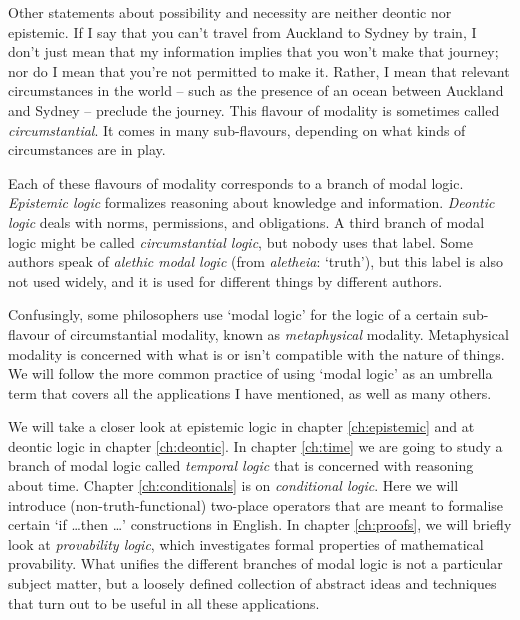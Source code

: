 
Other statements about possibility and necessity are neither deontic nor
epistemic. If I say that you can't travel from Auckland to Sydney by train, I
don't just mean that my information implies that you won't make that journey;
nor do I mean that you're not permitted to make it. Rather, I mean that relevant
circumstances in the world -- such as the presence of an ocean between Auckland
and Sydney -- preclude the journey. This flavour of modality is sometimes called
\emph{circumstantial}. It comes in many sub-flavours, depending on what kinds of
circumstances are in play.



Each of these flavours of modality corresponds to a branch of modal logic.
\emph{Epistemic logic} formalizes reasoning about knowledge and information.
\emph{Deontic logic} deals with norms, permissions, and obligations. A third
branch of modal logic might be called \emph{circumstantial logic}, but nobody
uses that label. Some authors speak of \emph{alethic modal logic} (from
\emph{aletheia}: `truth'), but this label is also not used widely, and it is
used for different things by different authors.



Confusingly, some philosophers use `modal logic' for the logic of a certain
sub-flavour of circumstantial modality, known as \emph{metaphysical} modality.
Metaphysical modality is concerned with what is or isn't compatible with the
nature of things. We will follow the more common practice of using `modal logic'
as an umbrella term that covers all the applications I have mentioned, as well
as many others.


We will take a closer look at epistemic logic in chapter \ref{ch:epistemic} and
at deontic logic in chapter \ref{ch:deontic}. In chapter \ref{ch:time} we are
going to study a branch of modal logic called \emph{temporal logic} that is
concerned with reasoning about time. Chapter \ref{ch:conditionals} is on
\emph{conditional logic}. Here we will introduce (non-truth-functional)
two-place operators that are meant to formalise certain `if \ldots then \ldots'
constructions in English. In chapter \ref{ch:proofs}, we will briefly look at
\emph{provability logic}, which investigates formal properties of mathematical
provability. What unifies the different branches of modal logic is not a
particular subject matter, but a loosely defined collection of abstract ideas
and techniques that turn out to be useful in all these applications.

